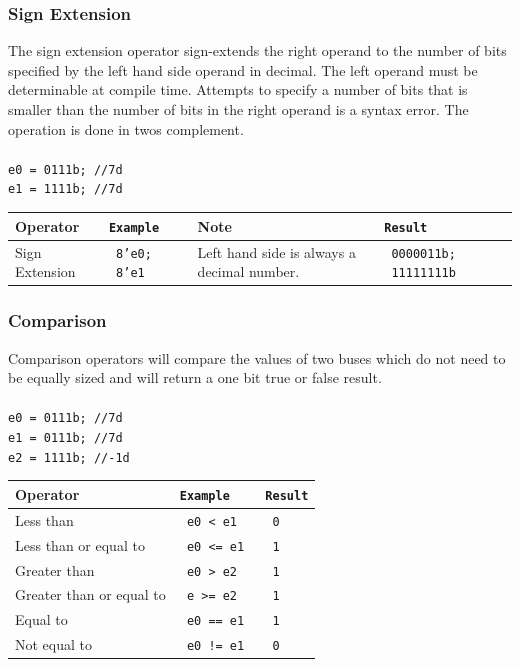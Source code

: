 \documentclass[letterpaper,11pt]{article}
\begin{document}
        \subsubsection{Sign Extension}
        The sign extension operator sign-extends the right operand to the number of bits specified by the 
        left hand side operand in decimal. The left operand must be determinable at compile time.
        Attempts to specify a number of bits that is smaller than the number of bits in the right operand is a 
        syntax error. The operation is done in twos complement.\\\\
        \texttt{e0 = 0111b; //7d}\\
        \texttt{e1 = 1111b; //7d}\\
        
        \begin{center} 
        \begin{tabular}{|l|>{\texttt\bgroup}l<{\egroup}|p{2in}|>{\texttt\bgroup}l<{\egroup}|}
        \hline
        Operator&Example&Note&Result\\ \hline
        Sign Extension &	8'e0; \ 8'e1	&	Left hand side is always a decimal number.     	&	
        0000011b; \ 11111111b \\ \hline
        \end{tabular}
        \end{center}
        
        \subsubsection{Comparison}
        Comparison operators will compare the values of two buses which do not need to be equally sized 
        and will return a one bit true or false result.\\\\        
        \texttt{e0 = 0111b; //7d}\\
        \texttt{e1 = 0111b; //7d}\\
        \texttt{e2 = 1111b; //-1d}\\
        
        
        \begin{center} 
        \begin{tabular}{|l|>{\texttt\bgroup}l<{\egroup}|>{\texttt\bgroup}l<{\egroup}|}
        \hline
        Operator&Example&Result\\ \hline
        Less than				&	e0 < e1 		&	0 \\ \hline
        Less than or equal to	&	e0 <= e1		& 	1 \\ \hline
        Greater than				&	e0 > e2		& 	1 \\ \hline
        Greater than or equal to &	e >= e2		& 	1 \\ \hline
        Equal to					& e0 == e1		& 	1 \\ \hline
        Not equal to				& e0 != e1		&	0 \\ \hline
        
        \end{tabular}
        \end{center}
        
\end{document}
